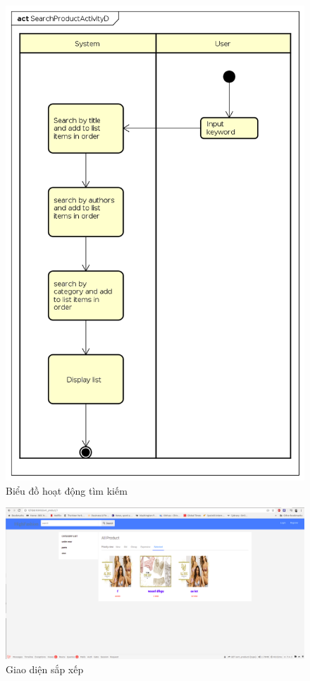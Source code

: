 \documentclass{article}
\begin{document}
\begin{figure}[h]
	\centering
	\includegraphics[scale=0.3]{figures/actsearch.png}
	\caption{Biểu đồ hoạt động tìm kiếm}
	\label{fig:actsearch}
\end{figure}

\begin{figure}[h]
	\centering
	\includegraphics[scale=0.2]{figures/insort.png}
	\caption{Giao diện sắp xếp}
	\label{fig:insort}
\end{figure}
\end{document}
